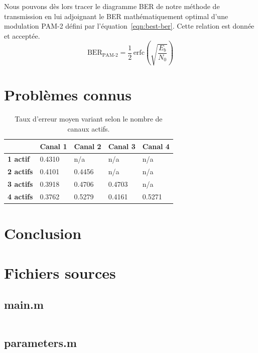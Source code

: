 \documentclass[10pt, oneside, a4paper]{article}
\begin{document}
Nous pouvons dès lors tracer le diagramme BER de notre méthode de transmission en lui adjoignant le BER mathématiquement optimal d'une modulation PAM-2 défini par l'équation~\ref{eqn:best-ber}. Cette relation est donnée et acceptée.
\begin{equation}
	\text{BER}_\text{PAM-2} = \frac{1}{2}\,\text{erfc}\left(\sqrt{\frac{E_b}{N_0}}\right)
	\label{eqn:best-ber}
\end{equation}


\section{Problèmes connus}

\begin{table}[!ht]
\centering
\begin{tabular}{l|llll}
& \bf Canal 1 & \bf Canal 2 & \bf Canal 3 & \bf Canal 4\\
\hline
\bf 1 actif  & 0.4310 & n/a    & n/a    & n/a\\
\bf 2 actifs & 0.4101 & 0.4456 & n/a    & n/a\\
\bf 3 actifs & 0.3918 & 0.4706 & 0.4703 & n/a\\
\bf 4 actifs & 0.3762 & 0.5279 & 0.4161 & 0.5271
\end{tabular}
\caption{Taux d'erreur moyen variant selon le nombre de canaux actifs.}
\end{table}

\section*{Conclusion}

\appendix
\clearpage

\section{Fichiers sources}
\label{sec:fichiers-sources}

\subsection{main.m}
\inputminted{matlab}{../main.m}
\label{app:main}

\subsection{parameters.m}
\inputminted{matlab}{../parameters.m}
\label{app:paremeters}
\end{document}
